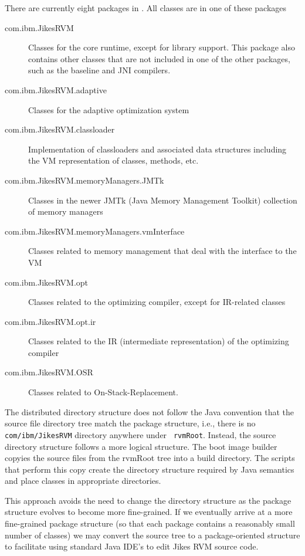 There are currently eight packages in \jrvm. All classes are in
one of these packages
\begin{description}
\item [com.ibm.JikesRVM] Classes for the core runtime, except for library
support.  This package also contains other classes that are not
included in one of the other packages, such as the baseline and JNI
compilers. 

\item [com.ibm.JikesRVM.adaptive] Classes for the adaptive optimization system

\item [com.ibm.JikesRVM.classloader] Implementation of classloaders
and associated data structures including the VM representation of classes,
methods, etc. 

\item [com.ibm.JikesRVM.memoryManagers.JMTk] Classes in the newer JMTk
(Java Memory Management Toolkit) collection of memory managers

\item [com.ibm.JikesRVM.memoryManagers.vmInterface] Classes related to
memory management that deal with the interface to the VM

\item [com.ibm.JikesRVM.opt] Classes related to the optimizing
compiler, except for IR-related classes

\item [com.ibm.JikesRVM.opt.ir] Classes related to the IR
(intermediate representation) of the optimizing compiler

\item [com.ibm.JikesRVM.OSR] Classes related to On-Stack-Replacement. 

\end{description}

The distributed directory structure
does not follow the Java convention that the source file directory tree
match the package structure, i.e.,
there is no {\tt com/ibm/JikesRVM} directory anywhere under {\tt
rvmRoot}.  Instead, the source directory structure follows a more logical 
structure.  The boot image builder
copyies the source files from the rvmRoot tree into a build
directory.  The scripts that perform this copy create the directory
structure required by Java semantics and place classes in appropriate
directories.

This approach avoids the need to change the directory structure as the
package structure evolves to become more fine-grained. If we
eventually arrive at a more fine-grained package structure (so that
each package contains a reasonably small number of classes) we may
convert the source tree to a package-oriented structure to facilitate
using standard Java IDE's to edit Jikes RVM source code.
